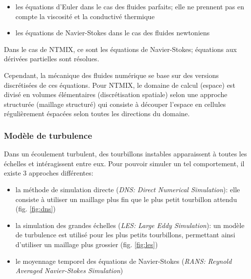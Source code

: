 \begin{itemize}
\item les équations d'Euler dans le cas des fluides parfaits; elle ne prennent pas en compte la viscosité et la conductivé thermique
\item les équations de Navier-Stokes dans le cas des fluides newtoniens
\end{itemize}


Dans le cas de NTMIX, ce sont les équations de Navier-Stokes; équations aux dérivées partielles sont résolues.

Cependant, la mécanique des fluides numérique se base sur des versions discrétisées de ces équations. Pour NTMIX, le domaine de calcul (espace) est divisé en volumes élémentaires (discrétisation spatiale) selon une approche structurée (maillage structuré) qui consiste à découper l'espace en cellules régulièrement éspacées selon toutes les directions du domaine.


\subsubsection{Modèle de turbulence}
Dans un écoulement turbulent, des tourbillons instables apparaissent à toutes les échelles et intéragissent entre eux. Pour pouvoir simuler un tel comportement, il existe 3 approches différentes:

\begin{itemize}
\item la méthode de simulation directe (\textit{DNS: Direct Numerical Simulation}): elle consiste à utiliser un maillage plus fin que le plus petit tourbillon attendu (fig. \ref{fig:dns})
\item la simulation des grandes échelles (\textit{LES: Large Eddy Simulation}): un modèle de turbulence est utilisé pour les plus petits tourbillons, permettant ainsi d'utiliser un maillage plus grossier (fig. \ref{fig:les})
\item le moyennage temporel des équations de Navier-Stokes (\textit{RANS: Reynold Averaged Navier-Stokes Simulation})
\end{itemize} 


